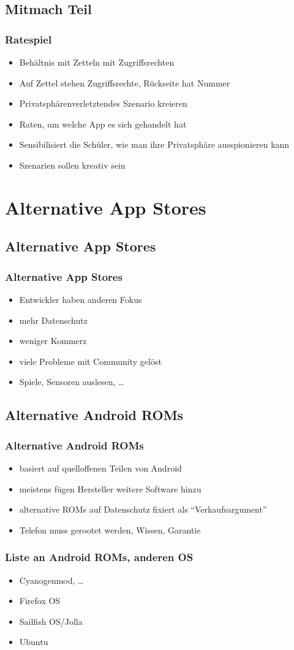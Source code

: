 \documentclass[12pt]{beamer}
\begin{document}
\subsection{Mitmach Teil}
\begin{frame}
	\frametitle{Ratespiel}
	\begin{itemize}
		\item Behältnis mit Zetteln mit Zugriffsrechten
		\item Auf Zettel stehen Zugriffsrechte, Rückseite hat Nummer
		\item Privatsphärenverletztendes Szenario kreieren
		\item Raten, um welche App es sich gehandelt hat
		\item Sensibilisiert die Schüler, wie man ihre Privatsphäre ausspionieren kann
		\item Szenarien sollen kreativ sein
	\end{itemize}
\end{frame}

\section{Alternative App Stores}
\subsection{Alternative App Stores}
\begin{frame}
	\frametitle{Alternative App Stores}
	\begin{itemize}
		\item Entwickler haben anderen Fokus
		\item mehr Datenschutz
		\item weniger Kommerz
		\item viele Probleme mit Community gelöst
		\item Spiele, Sensoren auslesen, \ldots
	\end{itemize}
\end{frame}
\subsection{Alternative Android ROMs}
\begin{frame}
	\frametitle{Alternative Android ROMs}
	\begin{itemize}
		\item basiert auf quelloffenen Teilen von Android
		\item meistens fügen Hersteller weitere Software hinzu
		\item alternative ROMs auf Datenschutz fixiert als "`Verkaufsargument"'
		\item Telefon muss gerootet werden, Wissen, Garantie
	\end{itemize}
\end{frame}

\begin{frame}
	\frametitle{Liste an Android ROMs, anderen OS}
	\begin{itemize}
		\item Cyanogenmod, \ldots
		\item Firefox OS
		\item Sailfish OS/Jolla
		\item Ubuntu
	\end{itemize}
\end{frame}
\end{document}
